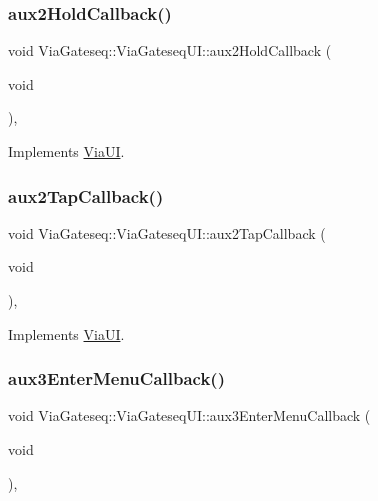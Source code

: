 \subsubsection{\texorpdfstring{aux2\+Hold\+Callback()}{aux2HoldCallback()}}
{\footnotesize\ttfamily void Via\+Gateseq\+::\+Via\+Gateseq\+U\+I\+::aux2\+Hold\+Callback (\begin{DoxyParamCaption}\item[{void}]{ }\end{DoxyParamCaption})\hspace{0.3cm}{\ttfamily [override]}, {\ttfamily [virtual]}}



Implements \mbox{\hyperlink{class_via_u_i_a42545b69c2bbbb036f633140fd8007d6}{Via\+UI}}.

\mbox{\label{class_via_gateseq_1_1_via_gateseq_u_i_a8e700657f1fe190238eca7c46541337b}} 
\subsubsection{\texorpdfstring{aux2\+Tap\+Callback()}{aux2TapCallback()}}
{\footnotesize\ttfamily void Via\+Gateseq\+::\+Via\+Gateseq\+U\+I\+::aux2\+Tap\+Callback (\begin{DoxyParamCaption}\item[{void}]{ }\end{DoxyParamCaption})\hspace{0.3cm}{\ttfamily [override]}, {\ttfamily [virtual]}}



Implements \mbox{\hyperlink{class_via_u_i_ae5e009dc22002f62e6bff8dd76d2f745}{Via\+UI}}.

\mbox{\label{class_via_gateseq_1_1_via_gateseq_u_i_a8235806bb28a40062b89b1cb9c83e3b0}} 
\subsubsection{\texorpdfstring{aux3\+Enter\+Menu\+Callback()}{aux3EnterMenuCallback()}}
{\footnotesize\ttfamily void Via\+Gateseq\+::\+Via\+Gateseq\+U\+I\+::aux3\+Enter\+Menu\+Callback (\begin{DoxyParamCaption}\item[{void}]{ }\end{DoxyParamCaption})\hspace{0.3cm}{\ttfamily [override]}, {\ttfamily [virtual]}}



